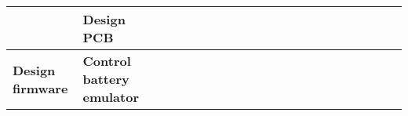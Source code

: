 \begin{table}[ht]
\begin{tabular}{ll|llllllllllllllllllll|}
    \multicolumn{1}{|l|}{\cellcolor[HTML]{38FFF8}\textbf{}}                & \cellcolor[HTML]{38FFF8}\textbf{Design PCB}                                                                          & \multicolumn{1}{l|}{}                                   & \multicolumn{1}{l|}{}                                   & \multicolumn{1}{l|}{}                                   & \multicolumn{1}{l|}{}                                   & \multicolumn{1}{l|}{}                                   & \multicolumn{1}{l|}{}                                   & \multicolumn{1}{l|}{}                                   & \multicolumn{1}{l|}{}                                   & \multicolumn{1}{l|}{}                                   & \multicolumn{1}{l|}{\cellcolor[HTML]{F8A102}}            & \multicolumn{1}{l|}{\cellcolor[HTML]{F8A102}}            & \multicolumn{1}{l|}{\cellcolor[HTML]{F8A102}}            & \multicolumn{1}{l|}{\cellcolor[HTML]{F8A102}}            & \multicolumn{1}{l|}{}                                    & \multicolumn{1}{l|}{}                                    & \multicolumn{1}{l|}{}                                    & \multicolumn{1}{l|}{}                                    & \multicolumn{1}{l|}{}                                    & \multicolumn{1}{l|}{}                                    &             \\ \hline
    \multicolumn{1}{|l|}{\cellcolor[HTML]{38FFF8}\textbf{Design firmware}} & \cellcolor[HTML]{38FFF8}\textbf{Control battery emulator}                                                            & \multicolumn{1}{l|}{}                                   & \multicolumn{1}{l|}{}                                   & \multicolumn{1}{l|}{}                                   & \multicolumn{1}{l|}{}                                   & \multicolumn{1}{l|}{}                                   & \multicolumn{1}{l|}{}                                   & \multicolumn{1}{l|}{}                                   & \multicolumn{1}{l|}{}                                   & \multicolumn{1}{l|}{}                                   & \multicolumn{1}{l|}{}                                    & \multicolumn{1}{l|}{\cellcolor[HTML]{F8A102}}            & \multicolumn{1}{l|}{\cellcolor[HTML]{F8A102}}            & \multicolumn{1}{l|}{\cellcolor[HTML]{F8A102}}            & \multicolumn{1}{l|}{\cellcolor[HTML]{F8A102}}            & \multicolumn{1}{l|}{\cellcolor[HTML]{F8A102}}            & \multicolumn{1}{l|}{}                                    & \multicolumn{1}{l|}{}                                    & \multicolumn{1}{l|}{}                                    & \multicolumn{1}{l|}{}                                    &             \\ \hline

\end{tabular}
\end{table}
